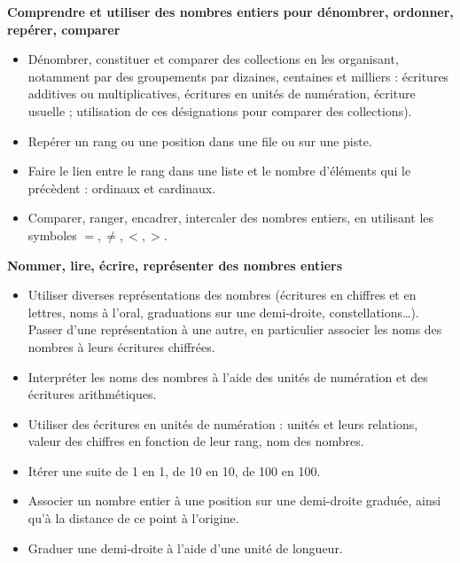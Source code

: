 \vfill

\begin{prerequis}
   {\footnotesize
   {\bf Comprendre et utiliser des nombres entiers pour dénombrer, ordonner, repérer, comparer}
   \begin{itemize}
      \item Dénombrer, constituer et comparer des collections en les organisant, notamment par des groupements par dizaines, centaines et milliers : écritures additives ou multiplicatives, écritures en unités de numération, écriture usuelle ; utilisation de ces désignations pour comparer des collections).
      \item Repérer un rang ou une position dans une file ou sur une piste.
      \item Faire le lien entre le rang dans une liste et le nombre d’éléments qui le précèdent : ordinaux et cardinaux.
      \item Comparer, ranger, encadrer, intercaler des nombres entiers, en utilisant les symboles $=, \neq, <, >$.
   \end{itemize}
   {\bf Nommer, lire, écrire, représenter des nombres entiers}
   \begin{itemize}
      \item Utiliser diverses représentations des nombres (écritures en chiffres et en lettres, noms à l’oral, graduations sur une demi-droite, constellations\dots). Passer d’une représentation à une autre, en particulier associer les noms des nombres à leurs écritures chiffrées.
      \item Interpréter les noms des nombres à l’aide des unités de numération et des écritures arithmétiques.
      \item Utiliser des écritures en unités de numération : unités et leurs relations, valeur des chiffres en fonction de leur rang, nom des nombres.
      \item Itérer une suite de 1 en 1, de 10 en 10, de 100 en 100.
      \item Associer un nombre entier à une position sur une demi-droite graduée, ainsi qu’à la distance de ce point à l’origine.
      \item Graduer une demi-droite à l’aide d’une unité de longueur.
   \end{itemize}}
\end{prerequis}

\vfill

